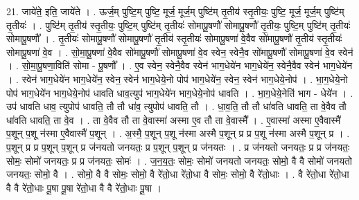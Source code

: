 \documentclass[17pt]{extarticle}
\begin{document}
21. जाये॑ते॒ इति॒ जाये॑ते । . ऊर्ज॒म् पुष्टि॒म् पुष्टि॒ मूर्ज॒ मूर्ज॒म् पुष्टि॑म् तृ॒तीय॑ स्तृ॒तीयः॒ पुष्टि॒ मूर्ज॒ मूर्ज॒म् पुष्टि॑म् तृ॒तीयः॑ । . पुष्टि॑म् तृ॒तीय॑ स्तृ॒तीयः॒ पुष्टि॒म् पुष्टि॑म् तृ॒तीयः॑ सोमापू॒षणौ॑ सोमापू॒षणौ॑ तृ॒तीयः॒ पुष्टि॒म् पुष्टि॑म् तृ॒तीयः॑ सोमापू॒षणौ᳚ । . तृ॒तीयः॑ सोमापू॒षणौ॑ सोमापू॒षणौ॑ तृ॒तीय॑ स्तृ॒तीयः॑ सोमापू॒षणा॑ वे॒वैव सो॑मापू॒षणौ॑ तृ॒तीय॑ स्तृ॒तीयः॑ सोमापू॒षणा॑ वे॒व । . सो॒मा॒पू॒षणा॑ वे॒वैव सो॑मापू॒षणौ॑ सोमापू॒षणा॑ वे॒व स्वेन॒ स्वेनै॒व सो॑मापू॒षणौ॑ सोमापू॒षणा॑ वे॒व स्वेन॑ । . सो॒मा॒पू॒षणा॒विति॑ सोमा - पू॒षणौ᳚ । . ए॒व स्वेन॒ स्वेनै॒वैव स्वेन॑ भाग॒धेये॑न भाग॒धेये॑न॒ स्वेनै॒वैव स्वेन॑ भाग॒धेये॑न । . स्वेन॑ भाग॒धेये॑न भाग॒धेये॑न॒ स्वेन॒ स्वेन॑ भाग॒धेये॒नो पोप॑ भाग॒धेये॑न॒ स्वेन॒ स्वेन॑ भाग॒धेये॒नोप॑ । . भा॒ग॒धेये॒नो पोप॑ भाग॒धेये॑न भाग॒धेये॒नोप॑ धावति धाव॒त्युप॑ भाग॒धेये॑न भाग॒धेये॒नोप॑ धावति । . भा॒ग॒धेये॒नेति॑ भाग - धेये॑न । . उप॑ धावति धाव॒ त्युपोप॑ धावति॒ तौ तौ धा॑व॒ त्युपोप॑ धावति॒ तौ । . धा॒व॒ति॒ तौ तौ धा॑वति धावति॒ ता वे॒वैव तौ धा॑वति धावति॒ ता वे॒व । . ता वे॒वैव तौ ता वे॒वास्मा॑ अस्मा ए॒व तौ ता वे॒वास्मै᳚ । . ए॒वास्मा॑ अस्मा ए॒वैवास्मै॑ प॒शून् प॒शू न॑स्मा ए॒वैवास्मै॑ प॒शून् । . अ॒स्मै॒ प॒शून् प॒शू न॑स्मा अस्मै प॒शून् प्र प्र प॒शू न॑स्मा अस्मै प॒शून् प्र । . प॒शून् प्र प्र प॒शून् प॒शून् प्र ज॑नयतो जनयतः॒ प्र प॒शून् प॒शून् प्र ज॑नयतः । . प्र ज॑नयतो जनयतः॒ प्र प्र ज॑नयतः॒ सोमः॒ सोमो॑ जनयतः॒ प्र प्र ज॑नयतः॒ सोमः॑ । . ज॒न॒य॒तः॒ सोमः॒ सोमो॑ जनयतो जनयतः॒ सोमो॒ वै वै सोमो॑ जनयतो जनयतः॒ सोमो॒ वै । . सोमो॒ वै वै सोमः॒ सोमो॒ वै रे॑तो॒धा रे॑तो॒धा वै सोमः॒ सोमो॒ वै रे॑तो॒धाः । . वै रे॑तो॒धा रे॑तो॒धा वै वै रे॑तो॒धाः पू॒षा पू॒षा रे॑तो॒धा वै वै रे॑तो॒धाः पू॒षा । \newline
\end{document}
